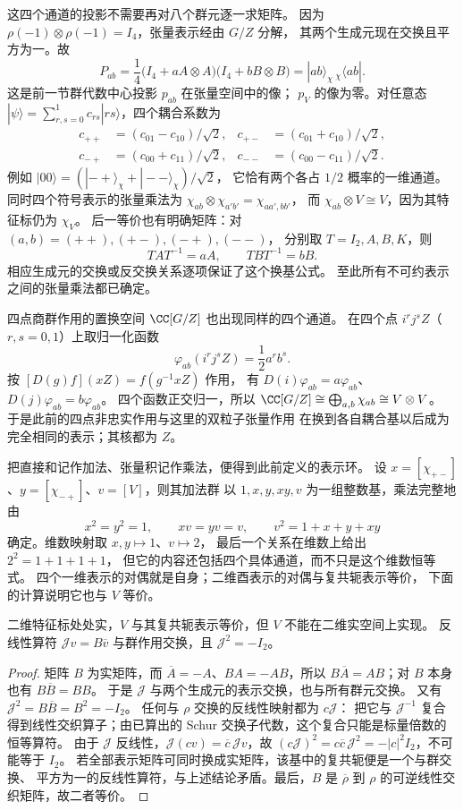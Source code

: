 这四个通道的投影不需要再对八个群元逐一求矩阵。
因为 $\rho(-1)\otimes\rho(-1)=I_4$，张量表示经由 $G/Z$ 分解，
其两个生成元现在交换且平方为一。故
\[
P_{ab}=\frac14\bigl(I_4+aA\otimes A\bigr)
                 \bigl(I_4+bB\otimes B\bigr)
=|ab\rangle_\chi\,{}_{\chi}\langle ab|.
\]
这是前一节群代数中心投影 $p_{ab}$ 在张量空间中的像；
$p_V$ 的像为零。对任意态
$|\psi\rangle=\sum_{r,s=0}^1c_{rs}|rs\rangle$，四个耦合系数为
\[
\begin{aligned}
c_{++}&=(c_{01}-c_{10})/\sqrt2,&
c_{+-}&=(c_{01}+c_{10})/\sqrt2,\\
c_{-+}&=(c_{00}+c_{11})/\sqrt2,&
c_{--}&=(c_{00}-c_{11})/\sqrt2.
\end{aligned}
\]
例如 $|00\rangle=(|-+\rangle_\chi+|--\rangle_\chi)/\sqrt2$，
它恰有两个各占 $1/2$ 概率的一维通道。
同时四个符号表示的张量乘法为
$\chi_{ab}\otimes\chi_{a'b'}=\chi_{aa',bb'}$，
而 $\chi_{ab}\otimes V\cong V$，因为其特征标仍为 $\chi_V$。
后一等价也有明确矩阵：对 $(a,b)=(++),(+-),(-+),(--)$，
分别取 $T=I_2,A,B,K$，则
\[
TAT^{-1}=aA,\qquad TBT^{-1}=bB.
\]
相应生成元的交换或反交换关系逐项保证了这个换基公式。
至此所有不可约表示之间的张量乘法都已确定。

四点商群作用的置换空间 $\CC[G/Z]$ 也出现同样的四个通道。
在四个点 $i^rj^sZ$（$r,s=0,1$）上取归一化函数
\[
\varphi_{ab}(i^rj^sZ)=\frac12a^r b^s.
\]
按 $[D(g)f](xZ)=f(g^{-1}xZ)$ 作用，
有 $D(i)\varphi_{ab}=a\varphi_{ab}$、
$D(j)\varphi_{ab}=b\varphi_{ab}$。
四个函数正交归一，所以
$\CC[G/Z]\cong\bigoplus_{a,b}\chi_{ab}\cong V\otimes V$。
于是此前的四点非忠实作用与这里的双粒子张量作用
在换到各自耦合基以后成为完全相同的表示；其核都为 $Z$。

把直接和记作加法、张量积记作乘法，便得到此前定义的表示环。
设 $x=[\chi_{+-}]$、$y=[\chi_{-+}]$、$v=[V]$，则其加法群
以 $1,x,y,xy,v$ 为一组整数基，乘法完整地由
\[
x^2=y^2=1,\qquad xv=yv=v,\qquad v^2=1+x+y+xy
\]
确定。维数映射取 $x,y\mapsto1$、$v\mapsto2$，
最后一个关系在维数上给出 $2^2=1+1+1+1$，
但它的内容还包括四个具体通道，而不只是这个维数恒等式。
四个一维表示的对偶就是自身；二维酉表示的对偶与复共轭表示等价，
下面的计算说明它也与 $V$ 等价。

\begin{proposition}[实特征标与四元数型表示]
\label{prop:q8-quaternionic-real-structure}
二维特征标处处实，$V$ 与其复共轭表示等价，但 $V$ 不能在二维实空间上实现。
反线性算符 $\mathcal Jv=B\overline v$ 与群作用交换，且 $\mathcal J^2=-I_2$。
\end{proposition}

\begin{proof}
矩阵 $B$ 为实矩阵，而 $\overline A=-A$、$BA=-AB$，所以
$B\overline A=AB$；对 $B$ 本身也有 $B\overline B=BB$。
于是 $\mathcal J$ 与两个生成元的表示交换，也与所有群元交换。
又有 $\mathcal J^2=B\overline B=B^2=-I_2$。
任何与 $\rho$ 交换的反线性映射都为 $c\mathcal J$：
把它与 $\mathcal J^{-1}$ 复合得到线性交织算子；由已算出的
Schur 交换子代数，这个复合只能是标量倍数的恒等算符。
由于 $\mathcal J$ 反线性，$\mathcal J(c v)=\overline c\,\mathcal Jv$，故
$(c\mathcal J)^2=c\overline c\,\mathcal J^2=-|c|^2I_2$，不可能等于 $I_2$。
若全部表示矩阵可同时换成实矩阵，该基中的复共轭便是一个与群交换、
平方为一的反线性算符，与上述结论矛盾。最后，$B$ 是 $\overline\rho$
到 $\rho$ 的可逆线性交织矩阵，故二者等价。
\end{proof}

